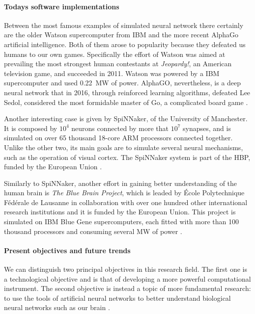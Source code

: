\paragraph{Todays software implementations\\}
Between the most famous examples of simulated neural network there certainly are the older Watson supercomputer from IBM and the more recent AlphaGo artificial intelligence.
Both of them arose to popularity because they defeated us humans to our own games.
Specifically the effort of Watson was aimed at prevailing the most strongest human contestants at \textit{Jeopardy!}, an American television game, and succeeded in 2011.
Watson was powered by a IBM supercomputer and used \SI{0.22}{\MW} of power.
AlphaGO, nevertheless, is a deep neural network that in 2016, through reinforced learning algorithms, defeated Lee Sedol, considered the most formidable master of Go, a complicated board game \cite{Nawrocki2016a}.

Another interesting case is given by SpiNNaker, of the University of Manchester.
It is composed by $10^4$ neurons connected by more that $10^7$ synapses, and is simulated on over 65 thousand 18-core ARM processors connected together.
Unlike the other two, its main goals are to simulate several neural mechanisms, such as the operation of visual cortex.
The SpiNNaker system is part of the \ac{HBP}, funded by the European Union \cite{HBP.eu, Nawrocki2016a}.

Similarly to SpiNNaker, another effort in gaining better understanding of the human brain is \textit{The Blue Brain Project}, which is leaded by École Polytechnique Fédérale de Lausanne in collaboration with over one hundred other international research institutions and it is funded by the European Union.
This project is simulated on IBM Blue Gene supercomputers, each fitted with more than 100 thousand processors and consuming several \si{\MW} of power \cite{Nawrocki2016a}.

\paragraph{Present objectives and future trends\\}
We can distinguish two principal objectives in this research field.
The first one is a technological objective and is that of developing a more powerful computational instrument.
The second objective is instead a topic of more fundamental research: to use the tools of artificial neural networks to better understand biological neural networks such as our brain \cite{sciamHBP, HBP.eu}.

